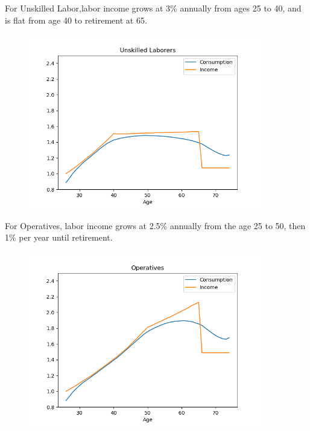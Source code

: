 \documentclass[]{article}
\begin{document}
\medskip

For Unskilled Labor,labor income grows at 3$\%$ annually from ages 25 to 40, and is flat from age 40 to retirement at 65.\\
\begin{figure}[H]
\centerline{\includegraphics[width=4in]{Figures/Figure5a.png}}
\end{figure}

\newpage

For Operatives, labor income grows at 2.5$\%$ annually from the age 25 to 50, then 1$\%$ per year until retirement. \\
\begin{figure}[H] 
\centerline{\includegraphics[width=4in]{Figures/Figure5b.png}}
\end{figure}

\medskip
\end{document}
